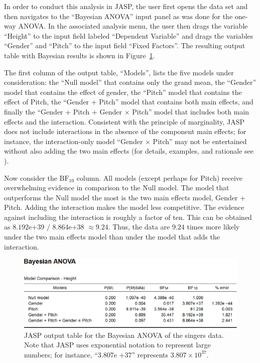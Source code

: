 In order to conduct this analysis in JASP, the user first opens the data set and then navigates to the ``Bayesian ANOVA'' input panel as was done for the one-way ANOVA. In the associated analysis menu, the user then drags the variable ``Height'' to the input field labeled ``Dependent Variable'' and drags the variables ``Gender'' and ``Pitch'' to the input field ``Fixed Factors''. The resulting output table with Bayesian results is shown in Figure~\ref{fig:bi2:SingersBANOVATable}.

The first column of the output table, ``Models'', lists the five models under consideration: the ``Null model'' that contains only the grand mean, the ``Gender'' model that contains the effect of gender, the ``Pitch'' model that contains the effect of Pitch, the ``Gender + Pitch'' model that contains both main effects, and finally the ``Gender + Pitch + Gender $\times$ Pitch'' model that includes both main effects and the interaction. Consistent with the principle of marginality, JASP does not include interactions in the absence of the component main effects; for instance, the interaction-only model ``Gender $\times$ Pitch'' may not be entertained without also adding the two main effects (for details, examples, and rationale see ).

Now consider the $\text{BF}_{10}$ column. All models (except perhaps for Pitch) receive overwhelming evidence in comparison to the Null model. The model that outperforms the Null model the most is the two main effects model, Gender + Pitch. Adding the interaction makes the model less competitive. The evidence against including the interaction is roughly a factor of ten. This can be obtained as $8.192$e+39 $/$ 8.864e+38 $\approx 9.24$. Thus, the data are $9.24$ times more likely under the two main effects model than under the model that adds the interaction. 

\begin{figure}[!tp]
    \begin{center}
        \includegraphics[width=\textwidth]{figs/bi2_SingersBANOVATable.eps}
        \caption{JASP output table for the Bayesian ANOVA of the singers data. Note that JASP uses exponential notation to represent large numbers; for instance, ``3.807e +37'' represents $3.807 \times 10^{37}$.} \label{fig:bi2:SingersBANOVATable}
    \end{center}
\end{figure}

